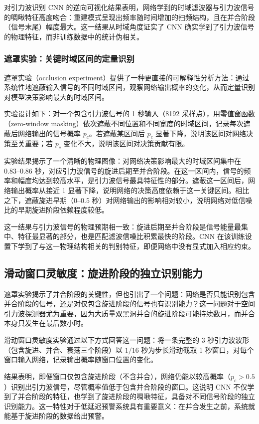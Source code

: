 对引力波识别 CNN 的逆向可视化结果表明，网络学到的时域滤波器与引力波信号的啁啾特征高度吻合：重建模式呈现出频率随时间增加的扫频结构，且在并合阶段（信号末尾）幅度最大。这一结果从时域角度证实了 CNN 确实学到了引力波信号的物理特征，而非训练数据中的统计伪相关。

\subsubsection*{遮罩实验：关键时域区间的定量识别}

遮罩实验（occlusion experiment）提供了一种更直接的可解释性分析方法：通过系统性地遮蔽输入信号的不同时域区间，观察网络输出概率的变化，从而定量识别对模型决策影响最大的时域区间。

实验设计如下：对一个包含引力波信号的 1 秒输入（8192 采样点），用零值窗函数（zero-window masking）依次遮蔽不同位置和不同宽度的时域区间，记录每次遮蔽后网络输出的信号概率 $p_c$。若遮蔽某区间后 $p_c$ 显著下降，说明该区间对网络决策至关重要；若 $p_c$ 变化不大，说明该区间对决策贡献有限。

实验结果揭示了一个清晰的物理图像：对网络决策影响最大的时域区间集中在 $0.83$--$0.86$ 秒，对应引力波信号的旋进后期至并合阶段。在这一区间内，信号的频率和幅度均达到较高水平，是引力波信号最具特征性的部分。遮蔽这一区间后，网络输出概率从接近 1 显著下降，说明网络的决策高度依赖于这一关键区间。相比之下，遮蔽旋进早期（$0$--$0.5$ 秒）对网络输出的影响相对较小，说明网络对低信噪比的早期旋进阶段依赖程度较低。

这一结果与引力波信号的物理预期相一致：旋进后期至并合阶段是信号能量最集中、特征最显著的部分，也是匹配滤波信噪比积累最快的阶段。CNN 在该训练设置下学到了与这一物理结构相关的判别特征，即便网络中没有显式加入相应约束。

\subsection{滑动窗口灵敏度：旋进阶段的独立识别能力}

遮罩实验揭示了并合阶段的关键性，但也引出了一个问题：网络是否只能识别包含并合阶段的信号，还是对仅包含旋进阶段的信号也有识别能力？这一问题对于空间引力波探测器尤为重要，因为大质量双黑洞并合的旋进阶段可能持续数月，而并合本身只发生在最后数小时。

滑动窗口灵敏度实验通过以下方式回答这一问题：将一条完整的 3 秒引力波波形（包含旋进、并合、衰荡三个阶段）以 $1/16$ 秒为步长滑动截取 1 秒窗口，对每个窗口输入网络，记录输出概率随窗口位置的变化。

结果表明，即便窗口仅包含旋进阶段（不含并合），网络仍能以较高概率（$p_c > 0.5$）识别出引力波信号，尽管概率值低于包含并合阶段的窗口。这说明 CNN 不仅学到了并合阶段的特征，也学到了旋进阶段的啁啾特征，具备对不同信号阶段的独立识别能力。这一特性对于低延迟预警系统具有重要意义：在并合发生之前，系统就能基于旋进阶段的数据给出预警。

